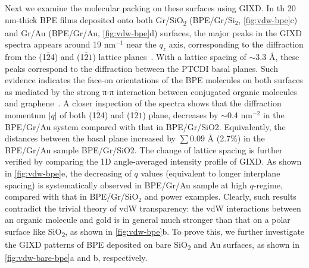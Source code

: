 %
Next we examine the molecular packing on these surfaces using GIXD.
In th 20 nm-thick BPE films deposited onto both
Gr/SiO\textsubscript{2} (BPE/Gr/Si$_{2}$, \autoref{fig:vdw-bpe}c) and
Gr/Au (BPE/Gr/Au, \autoref{fig:vdw-bpe}d) surfaces, the major peaks in
the GIXD spectra appears around 19 nm$^{-1}$ near the $q_{z}$ axis,
corresponding to the diffraction from the (1$\overline{2}$4) and
(1$\overline{2}1$) lattice
planes~\cite{Hadicke_1986_BPE,Mizuguchi_1998_BPE}.
%
With a lattice spacing of $\sim{}3.3$ \AA{}, these peaks correspond to
the diffraction between the PTCDI basal planes.
%
Such evidence indicates the face-on orientations of the BPE
molecules on both surfaces as mediated by the strong π-π interaction
between conjugated organic molecules and
graphene~\cite{Chiu_2013_BPE}.
%
A closer inspection of the spectra shows that the diffraction momentum
$|q|$ of both (1$\overline{2}$4) and (1$\overline{2}1$) plane,
decreases by $\sim{}$0.4 nm$^{-2}$ in the BPE/Gr/Au system
compared with that in BPE/Gr/SiO2.
%
Equivalently, the distances between the basal plane increased by
$\sum{}0.09$ \AA{} (2.7\%) in the BPE/Gr/Au sample BPE/Gr/SiO2.
%
The change of lattice spacing is further verified by comparing the 1D
angle-averaged intensity profile of GIXD. As shown in
\autoref{fig:vdw-bpe}e, the decreasing of $q$ values (equivalent to
longer inter\-plane spacing) is systematically observed in BPE/Gr/Au
sample at high $q$-regime, compared with that in BPE/Gr/SiO$_{2}$ and
power examples.
%
Clearly, such results contradict the trivial theory of vdW
transparency: the vdW interactions between an organic molecule and
gold is in general much stronger than that on a polar surface like
SiO\textsubscript{2}, as shown in \autoref{fig:vdw-bpe}b.
%
To prove this, we further investigate the GIXD patterns of BPE
deposited on bare SiO\textsubscript{2} and Au surfaces, as shown in
\autoref{fig:vdw-bare-bpe}a and b, respectively.

